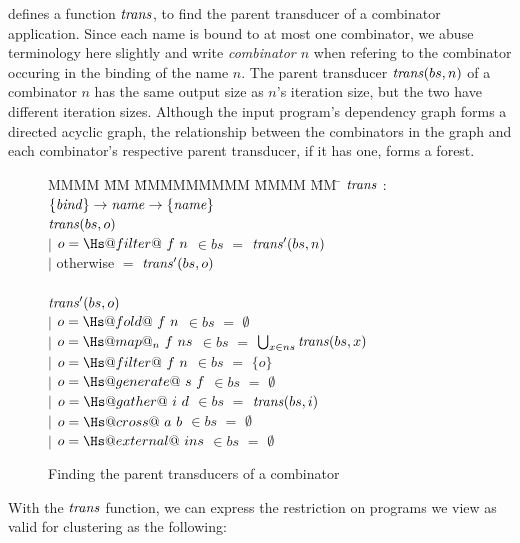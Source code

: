  defines a function $\mathit{trans}$, to find the parent transducer of a combinator application.
Since each name is bound to at most one combinator, we abuse terminology here slightly and write \emph{combinator $n$} when refering to the combinator occuring in the binding of the name $n$.
The parent transducer $\mathit{trans}(bs, n)$ of a combinator $n$ has the same output size as $n$'s iteration size, but the two have different iteration sizes.
Although the input program's dependency graph forms a directed acyclic graph, the relationship between the combinators in the graph and each combinator's respective parent transducer, if it has one, forms a forest.

\begin{figure}
\begin{tabbing}
MMMM \= MM \= MMMMMMMMM \= MMMM \= MM \= \kill
$\mathit{trans}$  \>$:$\> $\{\mathit{bind}\} \rightarrow \mathit{name} \rightarrow \{\mathit{name}\}$ \\
$\mathit{trans}(bs,o)$    \\
            \> $|$ \> $o = \Hs@filter@~f~n$    \> $\in bs$ \> $=$ \> $\mathit{trans}'(bs,n)$ \\
            \> $|$ \> otherwise             \>          \> $=$ \> $\mathit{trans}'(bs,o)$ \\
\\
$\mathit{trans}'(bs,o)$    \\
            \> $|$ \> $o = \Hs@fold@~f~n$      \> $\in bs$ \> $=$ \> $\emptyset$ \\
            \> $|$ \> $o = \Hs@map@_n~f~ns$    \> $\in bs$ \> $=$ \> $\bigcup_{x \in ns} \mathit{trans}(bs, x)$ \\
            \> $|$ \> $o = \Hs@filter@~f~n$    \> $\in bs$ \> $=$ \> $\{o\}$       \\
            \> $|$ \> $o = \Hs@generate@~s~f$  \> $\in bs$ \> $=$ \> $\emptyset$ \\
            \> $|$ \> $o = \Hs@gather@~i~d$    \> $\in bs$ \> $=$ \> $\mathit{trans}(bs,i)$ \\
            \> $|$ \> $o = \Hs@cross@~a~b$     \> $\in bs$ \> $=$ \> $\emptyset$ \\
            \> $|$ \> $o = \Hs@external@~ins$  \> $\in bs$ \> $=$ \> $\emptyset$ \\
\end{tabbing}
\caption{Finding the parent transducers of a combinator}
\label{fig:clustering:trans}
\end{figure}

With the $\mathit{trans}$ function, we can express the restriction on programs we view as valid for clustering as the following:

